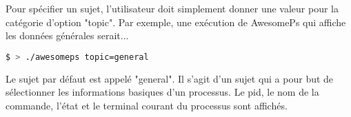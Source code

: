 Pour spécifier un sujet, l'utilisateur doit simplement donner une valeur pour la catégorie d'option "topic". Par exemple, une exécution de AwesomePs qui affiche les données générales serait...

\begin{lstlisting}[frame=single, language=bash]
$ > ./awesomeps topic=general
\end{lstlisting}

Le sujet par défaut est appelé "general". Il s'agit d'un sujet qui a pour but de sélectionner les informations basiques d'un processus. Le pid, le nom de la commande, l'état et le terminal courant du processus sont affichés.

